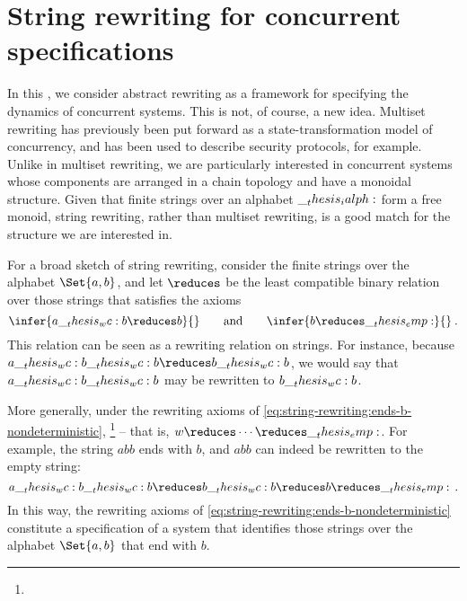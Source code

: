 \chapter{String rewriting for concurrent specifications}\label{ch:string-rewriting}

In this , we consider abstract rewriting as a framework for specifying the dynamics of concurrent systems.
This is not, of course, a new idea.
Multiset rewriting\autocites{Meseguer:TCS92}{Cervesato+Scedrov:IC09} has previously been put forward as a state-transformation model of concurrency, and has been used to describe security protocols\autocites{Cervesato+:CSFW99}{Durgin+:JCS04}, for example.
Unlike in multiset rewriting, we are particularly interested in concurrent systems whose components are arranged in a chain topology and have a monoidal structure.
Given that finite strings over an alphabet $\__thesis_ialph:$ form a free monoid, string rewriting, rather than multiset rewriting, is a good match for the structure we are interested in.

For a broad sketch of string rewriting, consider the finite strings over the alphabet $\Set{a,b}$, and let $\reduces$ be the least compatible binary relation over those strings that satisfies the axioms
\begin{equation}\label{eq:string-rewriting:ends-b-nondeterministic}
  \infer{a \wc b \reduces b}{}
  \qquad\text{and}\qquad
  \infer{b \reduces \emp}{}
  \:.
\end{equation}
This relation can be seen as a rewriting relation on strings.
For instance, because $a \wc b \wc b \reduces b \wc b$, we would say that $a \wc b \wc b$ may be rewritten to $b \wc b$.

More generally, under the rewriting axioms of \cref{eq:string-rewriting:ends-b-nondeterministic}, \footnote{} -- that is, $w \reduces \dotsb \reduces \emp$.
For example, the string $abb$ ends with $b$, and $abb$ can indeed be rewritten to the empty string:
\begin{equation*}
  a \wc b \wc b
    \reduces b \wc b
    \reduces b
    \reduces \emp
  \,.
\end{equation*}
In this way, the rewriting axioms of \cref{eq:string-rewriting:ends-b-nondeterministic} constitute a specification of a system that identifies those strings over the alphabet $\Set{a,b}$ that end with $b$.

